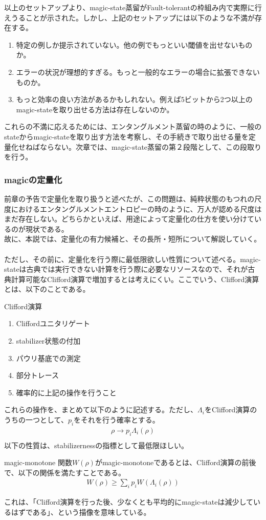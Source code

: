 \documentclass[a4paper,10.5pt]{article}
\numberwithin{equation}{section}
\begin{document}
以上のセットアップより、magic-state蒸留がFault-tolerantの枠組み内で実際に行えうることが示された。しかし、上記のセットアップには以下のような不満が存在する。
\begin{enumerate}
    \item 特定の例しか提示されていない。他の例でもっといい閾値を出せないものか。
    \item エラーの状況が理想的すぎる。もっと一般的なエラーの場合に拡張できないものか。
    \item もっと効率の良い方法があるかもしれない。例えば5ビットから2つ以上のmagic-stateを取り出せる方法は存在しないのか。
\end{enumerate}
これらの不満に応えるためには、エンタングルメント蒸留の時のように、一般のstateからmagic-stateを取り出す方法を考察し、その手続きで取り出せる量を定量化せねばならない。次章では、magic-state蒸留の第２段階として、この段取りを行う。

\subsubsection{magicの定量化}
前章の予告で定量化を取り扱うと述べたが、この問題は、純粋状態のもつれの尺度におけるエンタングルメントエントロピーの時のように、万人が認める尺度はまだ存在しない。どちらかといえば、用途によって定量化の仕方を使い分けているのが現状である。\\
故に、本説では、定量化の有力候補と、その長所・短所について解説していく。\\
\\
ただし、その前に、定量化を行う際に最低限欲しい性質について述べる。magic-stateは古典では実行できない計算を行う際に必要なリソースなので、それが古典計算可能なClifford演算で増加するとは考えにくい。ここでいう、Clifford演算とは、以下のことである。
\begin{defbox}{Clifford演算}
    \begin{enumerate}
    \item Cliffordユニタリゲート
    \item stabilizer状態の付加
    \item パウリ基底での測定
    \item 部分トレース
    \item 確率的に上記の操作を行うこと
\end{enumerate}
\end{defbox}
これらの操作を、まとめて以下のように記述する。ただし、$\Lambda_{i}$をClifford演算のうちの一つとして、$p_{i}$をそれを行う確率とする。
\begin{align*}
    \rho \to p_{i}\Lambda_{i}(\rho)\\
\end{align*}
以下の性質は、stabilizernessの指標として最低限ほしい。
\begin{defbox}{magic-monotone}
    関数$W(\rho)$がmagic-monotoneであるとは、Clifford演算の前後で、以下の関係を満たすことである。
    \begin{align*}
        W(\rho)\geq \sum_{i}p_{i}W(\Lambda_{i}(\rho))
    \end{align*}
\end{defbox}
これは、「Clifford演算を行った後、少なくとも平均的にmagic-stateは減少しているはずである」、という描像を意味している。\\
\end{document}
